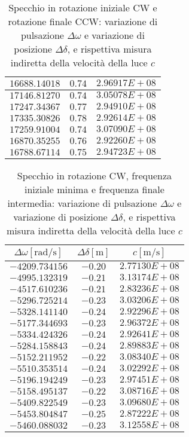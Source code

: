 \documentclass{article} %
\begin{document}
\begin{table}
\begin{tabular}{||c|c|c||}
            $16688.14018$ & $0.74$ & $2.96917E+08$ \\\hline
            $17146.81270$ & $0.74$ & $3.05078E+08$ \\\hline
            $17247.34367$ & $0.77$ & $2.94910E+08$ \\\hline
            $17335.30826$ & $0.78$ & $2.92614E+08$ \\\hline
            $17259.91004$ & $0.74$ & $3.07090E+08$ \\\hline
            $16870.35255$ & $0.76$ & $2.92260E+08$ \\\hline
            $16788.67114$ & $0.75$ & $2.94723E+08$ \\\hline
        \end{tabular}
        \caption{Specchio in rotazione iniziale CW e rotazione finale CCW: variazione di pulsazione $\Delta\omega$ e variazione di posizione $\Delta\delta$, e rispettiva misura indiretta della velocità della luce $c$}
        \label{CW_CCW}
    \end{table}

    \begin{table}
        \centering
        \begin{tabular}{||c|c|c||}
            \hline
            $\Delta \omega [\text{rad/s}]$ & $\Delta \delta [\text{m}]$ & $c [\text{m/s}]$ \\
            \hline\hline
            $-4209.734156$&$-0.20$&$2.77130E+08$\\\hline
            $-4995.132319$&$-0.21$&$3.13174E+08$\\\hline
            $-4517.610236$&$-0.21$&$2.83236E+08$\\\hline
            $-5296.725214$&$-0.23$&$3.03206E+08$\\\hline
            $-5328.141140$&$-0.24$&$2.92296E+08$\\\hline
            $-5177.344693$&$-0.23$&$2.96372E+08$\\\hline
            $-5334.424326$&$-0.24$&$2.92641E+08$\\\hline
            $-5284.158843$&$-0.24$&$2.89883E+08$\\\hline
            $-5152.211952$&$-0.22$&$3.08340E+08$\\\hline
            $-5510.353514$&$-0.24$&$3.02292E+08$\\\hline
            $-5196.194249$&$-0.23$&$2.97451E+08$\\\hline
            $-5158.495137$&$-0.22$&$3.08716E+08$\\\hline
            $-5409.822549$&$-0.23$&$3.09680E+08$\\\hline
            $-5453.804847$&$-0.25$&$2.87222E+08$\\\hline
            $-5460.088032$&$-0.23$&$3.12558E+08$\\\hline
        \end{tabular}
        \caption{Specchio in rotazione CW, frequenza iniziale minima e frequenza finale intermedia: variazione di pulsazione $\Delta\omega$ e variazione di posizione $\Delta\delta$, e rispettiva misura indiretta della velocità della luce $c$}
        \label{CW_min_mid}
    \end{table}
\end{document}
